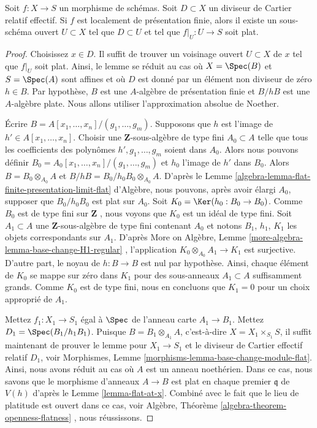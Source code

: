 \begin{lemma}
\label{lemma-flat-relative-Cartier-divisor}
Soit  $f : X \to S$  un morphisme de schémas. Soit  $D \subset X$  un diviseur de
Cartier relatif effectif. Si  $f$  est localement de présentation finie,
alors il existe un sous-schéma ouvert  $U \subset X$  tel que  $D \subset U$  et tel que
 $f|_U : U \to S$  soit plat.
\end{lemma}

\begin{proof}
Choisissez  $x \in D$. Il suffit de trouver un voisinage ouvert  $U \subset X$  de
 $x$  tel que  $f|_U$  soit plat. Ainsi, le lemme se réduit au cas où
 $X = \Spec(B)$  et  $S = \Spec(A)$  sont affines et où  $D$  est donné par un
élément non diviseur de zéro  $h \in B$. Par hypothèse,  $B$  est une
 $A$-algèbre de présentation finie et  $B/hB$  est une
 $A$-algèbre plate. Nous allons utiliser l'approximation absolue de
Noether.

\medskip\noindent
Écrire  $B = A[x_1, \ldots, x_n]/(g_1, \ldots, g_m)$. Supposons que  $h$  est l'image de  $h' \in A[x_1, \ldots, x_n]$.
Choisir une  $\mathbf{Z}$-sous-algèbre de type fini  $A_0 \subset A$  telle que tous les
coefficients des polynômes  $h', g_1, \ldots, g_m$  soient dans  $A_0$. Alors nous
pouvons définir  $B_0 = A_0[x_1, \ldots, x_n]/(g_1, \ldots, g_m)$  et  $h_0$  l'image de  $h'$  dans
 $B_0$. Alors  $B = B_0 \otimes_{A_0} A$  et  $B/hB = B_0/h_0B_0 \otimes_{A_0} A$. D'après le Lemme  \ref{algebra-lemma-flat-finite-presentation-limit-flat} 
d'Algèbre, nous pouvons, après avoir élargi  $A_0$, supposer que
 $B_0/h_0B_0$  est plat sur  $A_0$. Soit  $K_0 = \Ker(h_0 : B_0 \to B_0)$. Comme  $B_0$  est
de type fini sur  $\mathbf{Z}$ , nous voyons que  $K_0$  est un idéal de type
fini. Soit  $A_1 \subset A$  une  $\mathbf{Z}$-sous-algèbre de type fini contenant
 $A_0$  et notons  $B_1$,  $h_1$,  $K_1$  les objets
correspondants sur  $A_1$. D'après More on Algèbre, Lemme  \ref{more-algebra-lemma-base-change-H1-regular} ,
l'application  $K_0 \otimes_{A_0} A_1 \to K_1$  est surjective. D'autre part, le noyau de  $h : B \to B$ 
est nul par hypothèse. Ainsi, chaque élément de  $K_0$  se mappe sur zéro
dans  $K_1$  pour des sous-anneaux  $A_1 \subset A$ suffisamment grands. Comme
 $K_0$  est de type fini, nous en concluons que  $K_1 = 0$  pour un choix
approprié de  $A_1$.

\medskip\noindent
Mettez  $f_1 : X_1 \to S_1$  égal à  $\Spec$  de l'anneau carte  $A_1 \to B_1$. Mettez
 $D_1 = \Spec(B_1/h_1B_1)$. Puisque  $B = B_1 \otimes_{A_1} A$, c'est-à-dire  $X = X_1 \times_{S_1} S$, il suffit
maintenant de prouver le lemme pour  $X_1 \to S_1$  et le diviseur de Cartier
effectif relatif  $D_1$, voir Morphismes, Lemme  \ref{morphisms-lemma-base-change-module-flat}. Ainsi, nous
avons réduit au cas où  $A$  est un anneau noethérien. Dans ce cas, nous
savons que le morphisme d'anneaux  $A \to B$  est plat en chaque premier
 $\mathfrak q$  de  $V(h)$  d'après le Lemme  \ref{lemma-flat-at-x}. Combiné avec le fait
que le lieu de platitude est ouvert dans ce cas, voir Algèbre, Théorème
 \ref{algebra-theorem-openness-flatness} , nous réussissons.
\end{proof}

